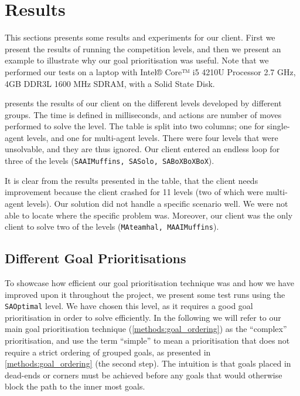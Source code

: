 \section{Results}
\label{sec:results}


This sections presents some results and experiments for our client.
First we present the results of running the competition levels, and then we present an example to illustrate why our goal prioritisation was useful.
Note that we performed our tests on a laptop with Intel® Core™ i5 4210U Processor 2.7 GHz, 4GB DDR3L 1600 MHz SDRAM, with a Solid State Disk.

 presents the results of our client on the different levels developed by different groups.
The time is defined in milliseconds, and actions are number of moves performed to solve the level.
The table is split into two columns; one for single-agent levels, and one for multi-agent levels.
There were four levels that were unsolvable, and they are thus ignored.
Our client entered an endless loop for three of the levels (\texttt{SAAIMuffins, SASolo, SABoXBoXBoX}).

It is clear from the results presented in the table, that the client needs improvement because the client crashed for 11 levels (two of which were multi-agent levels).
Our solution did not handle a specific scenario well.
We were not able to locate where the specific problem was.
Moreover, our client was the only client to solve two of the levels (\texttt{MAteamhal, MAAIMuffins}).



\subsection{Different Goal Prioritisations}

To showcase how efficient our goal prioritisation technique was and how we have improved upon it throughout the project, we present some test runs using the \texttt{SAOptimal} level. 
We have chosen this level, as it requires a good goal prioritisation in order to solve efficiently.
In the following we will refer to our main goal prioritisation technique (\cref{methods:goal_ordering}) as the ``complex'' prioritisation, and use the term ``simple'' to mean a prioritisation that does not require a strict ordering of grouped goals, as presented in \cref{methods:goal_ordering} (the second step).
The intuition is that goals placed in dead-ends or corners must be achieved before any goals that would otherwise block the path to the inner most goals.

